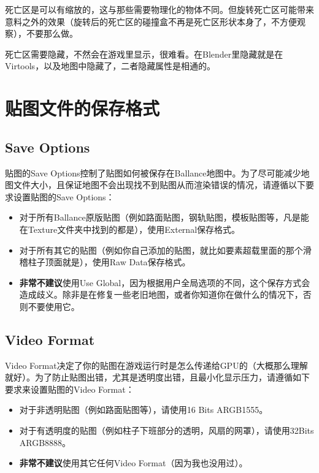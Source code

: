 死亡区是可以有缩放的，这与那些需要物理化的物体不同。但旋转死亡区可能带来意料之外的效果（旋转后的死亡区的碰撞盒不再是死亡区形状本身了，不方便观察），不要那么做。

死亡区需要隐藏，不然会在游戏里显示，很难看。在Blender里隐藏就是在Virtools，以及地图中隐藏了，二者隐藏属性是相通的。

\section{贴图文件的保存格式}

\subsection{Save Options}

贴图的Save Options控制了贴图如何被保存在Ballance地图中。为了尽可能减少地图文件大小，且保证地图不会出现找不到贴图从而渲染错误的情况，请遵循以下要求设置贴图的Save Options：

\begin{itemize}

\item 对于所有Ballance原版贴图（例如路面贴图，钢轨贴图，模板贴图等，凡是能在Texture文件夹中找到的都是），使用External保存格式。

\item 对于所有其它的贴图（例如你自己添加的贴图，就比如要素超载里面的那个滑稽柱子顶面就是），使用Raw Data保存格式。

\item \textbf{非常不建议}使用Use Global，因为根据用户全局选项的不同，这个保存方式会造成歧义。除非是在修复一些老旧地图，或者你知道你在做什么的情况下，否则不要使用它。

\end{itemize}

\subsection{Video Format}

Video Format决定了你的贴图在游戏运行时是怎么传递给GPU的（大概那么理解就好）。为了防止贴图出错，尤其是透明度出错，且最小化显示压力，请遵循如下要求来设置贴图的Video Format：

\begin{itemize}

\item 对于非透明贴图（例如路面贴图等），请使用16 Bits ARGB1555。

\item 对于有透明度的贴图（例如柱子下班部分的透明，风扇的网罩），请使用32Bits ARGB8888。

\item \textbf{非常不建议}使用其它任何Video Format（因为我也没用过）。

\end{itemize}

